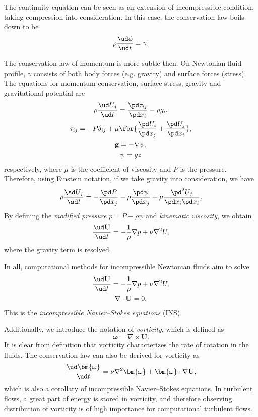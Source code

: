 \documentclass[english, nochinese]{pkupaper}
\begin{document}
The continuity equation can be seen as an extension of incompressible condition, taking compression into consideration. In this case, the conservation law boils down to be
\begin{equation}
\rho \frac{ \ud \phi }{ \ud t } = \gamma.
\end{equation}

The conservation law of momentum is more subtle then. On Newtonian fluid profile, $\gamma$ consists of both body forces (e.g. gravity) and surface forces (stress). The equations for momentum conservation, surface stress, gravity and gravitational potential are
\begin{gather}
\rho \frac{ \ud U_j }{ \ud t } = \frac{ \pd \tau_{ i j } }{ \pd x_i } - \rho g_i, \\
\tau_{ i j } = - P \delta_{ i j } + \mu \rbr{ \frac{ \pd U_i }{ \pd x_j } + \frac{ \pd U_j }{ \pd x_i } }, \\
\mathbf{g} = -\nabla \psi, \\
\psi = g z 
\end{gather}
respectively, where $\mu$ is the coefficient of viscosity and $P$ is the pressure. Therefore, using Einstein notation, if we take gravity into consideration, we have
\begin{equation}
\rho \frac{ \sd U_j }{ \sd t } = - \frac{ \pd P }{ \pd x_j } - \rho \frac{ \pd \psi }{ \pd x_j } + \mu \frac{ \pd^2 U_j }{ \pd x_i \pd x_i }.
\end{equation}
By defining the \emph{modified pressure} $ p = P - \rho \psi $ and \emph{kinematic viscosity}, we obtain
\begin{equation}
\frac{ \ud \mathbf{U} }{ \ud t } = -\frac{1}{\rho} \nabla p + \nu \nabla^2 U,
\end{equation}
where the gravity term is resolved.

In all, computational methods for incompressible Newtonian fluids aim to solve
\begin{equation} \label{Eq:INS}
\begin{gathered}
\frac{ \ud \mathbf{U} }{ \ud t } =  - \frac{1}{\rho} \nabla p + \nu \nabla^2 U, \\
\nabla \cdot \mathbf{U} = 0.
\end{gathered}
\end{equation}
This is the \emph{incompressible Navier--Stokes equations} (INS).

Additionally, we introduce the notation of \emph{vorticity}, which is defined as
\begin{equation}
\bm{\omega} = \nabla \times \mathbf{U}.
\end{equation}
It is clear from definition that vorticity characterizes the rate of rotation in the fluids. The conservation law can also be derived for vorticity as
\begin{equation}
\frac{ \ud \bm{\omega} }{ \ud t } = \nu \nabla^2 \bm{\omega} + \bm{\omega} \cdot \nabla \mathbf{U},
\end{equation}
which is also a corollary of incompressible Navier--Stokes equations. In turbulent flows, a great part of energy is stored in vorticity, and therefore observing distribution of vorticity is of high importance for computational turbulent flows.
\end{document}
